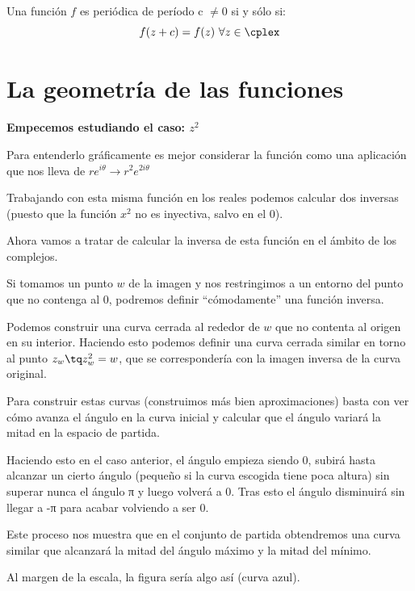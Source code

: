 \documentclass{apuntes}
\begin{document}
\begin{defn}
Una función $f$ es periódica de período c $\neq 0$ si y sólo si:
\[f(z+c)=f(z) \ \forall z \in \cplex\]
\end{defn}

\section{La geometría de las funciones}
\textbf{Empecemos estudiando el caso: $z^2$}

Para entenderlo gráficamente es mejor considerar la función como una aplicación que nos lleva de $re^{i\theta} \to r^2e^{2i\theta}$

\begin{figure}[hbtp]
  \centering
\end{figure}

Trabajando con esta misma función en los reales podemos calcular dos inversas (puesto que la función $x^2$ no es inyectiva, salvo en el 0).

Ahora vamos a tratar de calcular la inversa de esta función en el ámbito de los complejos.

Si tomamos un punto $w$ de la imagen y nos restringimos a un entorno del punto que no contenga al 0, podremos definir ``cómodamente'' una función inversa.

Podemos construir una curva cerrada al rededor de $w$ que no contenta al origen en su interior. Haciendo esto podemos definir una curva cerrada similar en torno al punto $z_w \tq z_w^2=w$, que se correspondería con la imagen inversa de la curva original.

\obs Para construir estas curvas (construimos más bien aproximaciones) basta con ver cómo avanza el ángulo en la curva inicial y calcular que el ángulo variará la mitad en la espacio de partida.

Haciendo esto en el caso anterior, el ángulo empieza siendo 0, subirá hasta alcanzar un cierto ángulo (pequeño si la curva escogida tiene poca altura) sin superar nunca el ángulo π y luego volverá a 0. Tras esto el ángulo disminuirá sin llegar a -π para acabar volviendo a ser 0.

Este proceso nos muestra que en el conjunto de partida obtendremos una curva similar que alcanzará la mitad del ángulo máximo y la mitad del mínimo.

Al margen de la escala, la figura sería algo así (curva azul).
\end{document}
